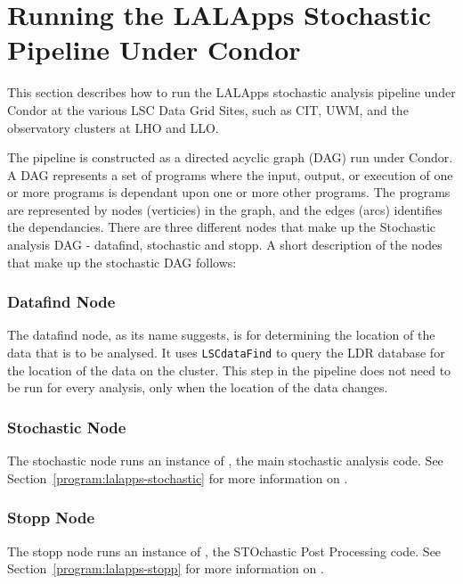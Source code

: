 
\section{Running the LALApps Stochastic Pipeline Under Condor}

This section describes how to run the LALApps stochastic analysis
pipeline under Condor at the various LSC Data Grid Sites, such as CIT,
UWM, and the observatory clusters at LHO and LLO.

The pipeline is constructed as a directed acyclic graph (DAG) run under
Condor. A DAG represents a set of programs where the input, output, or
execution of one or more programs is dependant upon one or more other
programs. The programs are represented by nodes (verticies) in the
graph, and the edges (arcs) identifies the dependancies. There are three
different nodes that make up the Stochastic analysis DAG - datafind,
stochastic and stopp. A short description of the nodes that make up the
stochastic DAG follows:

\subsubsection{Datafind Node}

The datafind node, as its name suggests, is for determining the location
of the data that is to be analysed. It uses \texttt{LSCdataFind} to
query the LDR database for the location of the data on the cluster. This
step in the pipeline does not need to be run for every analysis, only
when the location of the data changes.

\subsubsection{Stochastic Node}

The stochastic node runs an instance of , the
main stochastic analysis code. See
Section~\ref{program:lalapps-stochastic} for more information on
.

\subsubsection{Stopp Node}

The stopp node runs an instance of , the STOchastic
Post Processing code. See Section~\ref{program:lalapps-stopp} for more
information on .

